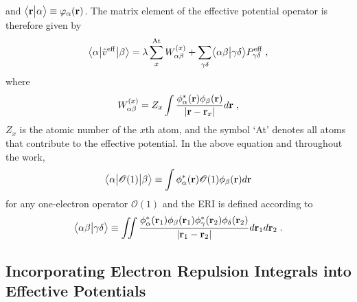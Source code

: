 %
and $\bigl\langle {\bf r} \bigl\lvert {\alpha} \bigr\rangle \equiv \varphi_\alpha({\bf r})$.
The matrix element of the effective potential operator
is therefore given by
%
\begin{equation} \label{e:oep-matrix-element}
	\bigl\langle {\alpha} \bigl\lvert { \hat{v}^{\rm eff} } \bigl\lvert {\beta} \bigr\rangle
	= \lambda \sum_x^{\rm At} W_{\alpha\beta}^{(x)} +
        \sum_{\gamma\delta} \bigl\langle {\alpha\beta} \bigl\lvert {\gamma\delta} \bigr\rangle P^{\rm eff}_{\gamma\delta}  \;,
\end{equation}
%
where 
%
\begin{equation} \label{e:oep-matrix-element-nuc}
 W_{\alpha\beta}^{(x)} = 
 Z_x \int \frac{\phi^*_\alpha({\bf r}) \phi_\beta({\bf r})}{\vert {\bf r} - {\bf r}_x \vert} d{\bf r} \;,
\end{equation}
%
$Z_x$ is the atomic number of the $x$th atom,
and the symbol `At' denotes all atoms that contribute to the effective potential.
In the above equation and throughout the work, 
%
\begin{equation} \label{e:1el-operator}
\bigl\langle {\alpha} \bigl\lvert {\mathscr{O}(1)} \bigl\lvert {\beta} \bigr\rangle \equiv \int \phi^*_\alpha({\bf r}) \mathscr{O}(1) \phi_\beta({\bf r}) d{\bf r} 
\end{equation}
%
for any one\hyp{}electron operator $\mathscr{O}(1)$ 
and the ERI
is defined according to
%
\begin{equation} \label{e:eri}
	\bigl\langle {\alpha\beta} \bigl\lvert {\gamma\delta} \bigr\rangle \equiv
	\iint 
	\frac{ \phi_\alpha^{*}({\bf r}_1) \phi_\beta({\bf r}_1) 
	       \phi_\gamma^{*}({\bf r}_2) \phi_\delta({\bf r}_2) }{ \vert {\bf r}_1 - {\bf r}_2 \vert}
	d{\bf r}_1 d{\bf r}_2  \;.
\end{equation}
%

\subsection{\label{ss:2.1.oep-technique}Incorporating Electron Repulsion Integrals into Effective Potentials}

